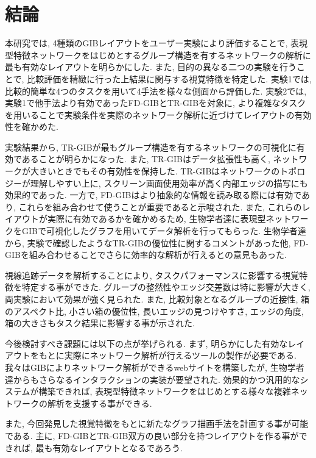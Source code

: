 \documentclass{kuee}
\begin{document}
\chapter{結論}
本研究では, 4種類のGIBレイアウトをユーザー実験により評価することで, 表現型特徴ネットワークをはじめとするグループ構造を有するネットワークの解析に最も有効なレイアウトを明らかにした.
また, 目的の異なる二つの実験を行うことで, 比較評価を精緻に行った上結果に関与する視覚特徴を特定した.
実験1では, 比較的簡単な4つのタスクを用いて4手法を様々な側面から評価した.
実験2では, 実験1で他手法より有効であったFD-GIBとTR-GIBを対象に, より複雑なタスクを用いることで実験条件を実際のネットワーク解析に近づけてレイアウトの有効性を確かめた.

実験結果から, TR-GIBが最もグループ構造を有するネットワークの可視化に有効であることが明らかになった.
また, TR-GIBはデータ拡張性も高く, ネットワークが大きいときでもその有効性を保持した.
TR-GIBはネットワークのトポロジーが理解しやすい上に, スクリーン画面使用効率が高く内部エッジの描写にも効果的であった.
一方で, FD-GIBはより抽象的な情報を読み取る際には有効であり, これらを組み合わせて使うことが重要であると示唆された.
また, これらのレイアウトが実際に有効であるかを確かめるため, 生物学者達に表現型ネットワークをGIBで可視化したグラフを用いてデータ解析を行ってもらった.
生物学者達から, 実験で確認したようなTR-GIBの優位性に関するコメントがあった他, FD-GIBを組み合わせることでさらに効率的な解析が行えるとの意見もあった.

視線追跡データを解析することにより, タスクパフォーマンスに影響する視覚特徴を特定する事ができた.
グループの整然性やエッジ交差数は特に影響が大きく, 両実験において効果が強く見られた.
また, 比較対象となるグループの近接性, 箱のアスペクト比, 小さい箱の優位性, 長いエッジの見つけやすさ, エッジの角度, 箱の大きさもタスク結果に影響する事が示された.

今後検討すべき課題には以下の点が挙げられる.
まず, 明らかにした有効なレイアウトをもとに実際にネットワーク解析が行えるツールの製作が必要である.
我々はGIBによりネットワーク解析ができるwebサイトを構築したが, 生物学者達からもさらなるインタラクションの実装が要望された.
効果的かつ汎用的なシステムが構築できれば, 表現型特徴ネットワークをはじめとする様々な複雑ネットワークの解析を支援する事ができる.

また, 今回発見した視覚特徴をもとに新たなグラフ描画手法を計画する事が可能である.
主に, FD-GIBとTR-GIB双方の良い部分を持つレイアウトを作る事ができれば, 最も有効なレイアウトとなるであろう.
\end{document}
